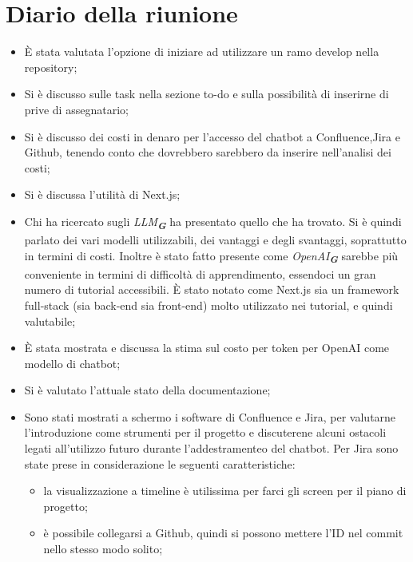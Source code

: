 
\section{Diario della riunione}

\begin{itemize}
    \item È stata valutata l'opzione di iniziare ad utilizzare un ramo develop nella repository;
    \item Si è discusso sulle task nella sezione to-do e sulla possibilità di inserirne di prive di assegnatario;
    \item Si è discusso dei costi in denaro per l'accesso del chatbot a Confluence,Jira e Github, tenendo conto che dovrebbero sarebbero da inserire nell'analisi dei costi;
    \item Si è discussa l'utilità di Next.js;
    \item Chi ha ricercato sugli \emph{LLM}\textsubscript{\textit{\textbf{G}}} ha presentato quello che ha trovato. Si è quindi parlato dei vari modelli utilizzabili, dei vantaggi e degli svantaggi, soprattutto in termini di costi. Inoltre è stato fatto presente come \emph{OpenAI}\textsubscript{\textit{\textbf{G}}} sarebbe più conveniente in termini di difficoltà di apprendimento, essendoci un gran numero di tutorial accessibili. È stato notato come Next.js sia un framework full-stack (sia back-end sia front-end) molto utilizzato nei tutorial, e quindi valutabile;
    \item È stata mostrata e discussa la stima sul costo per token per OpenAI come modello di chatbot;
    \item Si è valutato l'attuale stato della documentazione;
    \item Sono stati mostrati a schermo i software di Confluence e Jira, per valutarne l'introduzione come strumenti per il progetto e discuterene alcuni ostacoli legati all'utilizzo futuro durante l'addestramenteo del chatbot.
    Per Jira sono state prese in considerazione le seguenti caratteristiche:
    \begin{itemize}
    \item la visualizzazione a timeline è utilissima per farci gli screen per il piano di progetto;
    \item è possibile collegarsi a Github, quindi si possono mettere l'ID nel commit nello stesso modo solito;

\end{itemize}
\end{itemize}
